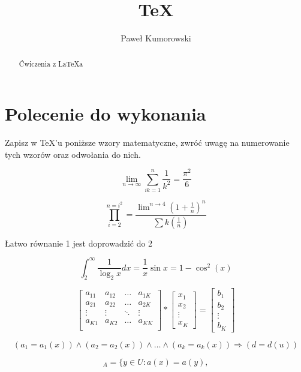 \documentclass[a4paper,12pt]{article}
\title{\TeX}
\author{Paweł Kumorowski}
\begin{document}
\maketitle

\begin{abstract}
Ćwiczenia z La\TeX a
\end{abstract}

\section{Polecenie do wykonania}
Zapisz w TeX'u poniższe wzory matematyczne, zwróć uwagę na numerowanie tych wzorów oraz odwołania do nich.

\begin{equation}
\lim\limits_{n \to \infty} \sum_{ik=1}^n \frac{1}{k^{2}} = \frac{\pi^{2}}{6}
\label{eq:rownanie}
\end{equation}

\begin{equation}
\prod_{i=2}^{n=i^2}=\frac{\lim\nolimits^{n \to 4}(1+\frac{1}{n})^n}{\sum k(\frac{1}{n})}
\label{eq:rownanie}
\end{equation}

Łatwo równanie 1 jest doprowadzić do 2

\begin{equation}
\int_2^\infty\frac{1}{\log_2x}dx=\frac{1}{x}\sin x=1-\cos^2(x)
\label{eq:rownanie}
\end{equation}

\begin{equation}
\left[\begin{array}{cccc}
a_{11} & a_{12} & \ldots & a_{1K}\\
a_{21} & a_{22} & \ldots & a_{2K}\\
\vdots & \vdots & \ddots &\vdots \\
a_{K1} & a_{K2} & \ldots & a_{KK}\\
\end{array}\right]
*
\left[\begin{array}{c}
x_1 \\
x_2 \\
\vdots \\
x_K
\end{array} \right]
=
\left[\begin{array}{c}
b_1 \\
b_2 \\
\vdots \\
b_K
\end{array}\right]
\label{eq:rownanie}
\end{equation}

\begin{equation}
(a_1=a_1(x))\wedge(a_2=a_2(x))\wedge\dots\wedge(a_k=a_k(x))\Rightarrow(d=d(u))
\label{eq:rownanie}
\end{equation}

\begin{equation}
[x]_A=\{y\in U:a(x)=a(y),
\label{eq:rownanie}
\end{equation}
\end{document}

